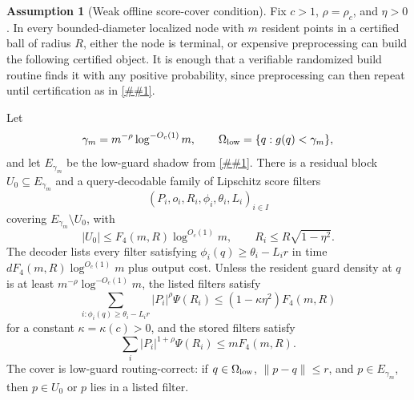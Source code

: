 \documentclass[10pt]{article}
\newcommand{\cref}[1]{\ref{##1}}
\theoremstyle{definition}
\newtheorem{assumption}[theorem]{Assumption}
\begin{document}
\begin{assumption}[Weak offline score-cover condition]\label{asm:weak-offline-score-cover}
   Fix $c>1$, $\rho=\rho_c$, and $\eta>0$.  In every bounded-diameter localized
   node with $m$ resident points in a certified ball of radius $R$, either the
   node is terminal, or expensive preprocessing can build the following
   certified object.  It is enough that a verifiable randomized build routine
   finds it with any positive probability, since preprocessing can then repeat
   until certification as in \cref{lem:las-vegas-offline}.

   Let
   \[
      \gamma_m=m^{-\rho}\log^{-O_c(1)}m,
      \qquad
      \Omega_{\rm low}=\{q:g(q)<\gamma_m\},
   \]
   and let $E_{\gamma_m}$ be the low-guard shadow from
   \cref{lem:low-guard-shadow}.  There is a residual block
   $U_0\subseteq E_{\gamma_m}$ and a query-decodable family of Lipschitz score
   filters
   \[
      (P_i,o_i,R_i,\phi_i,\theta_i,L_i)_{i\in I}
   \]
   covering $E_{\gamma_m}\setminus U_0$, with
   \[
      |U_0|\le F_4(m,R)\log^{O_c(1)}m,
      \qquad
      R_i\le R\sqrt{1-\eta^2}.
   \]
   The decoder lists every filter satisfying
   $\phi_i(q)\ge\theta_i-L_i r$ in time
   $dF_4(m,R)\log^{O_c(1)}m$ plus output cost.  Unless the resident guard
   density at $q$ is at least $m^{-\rho}\log^{-O_c(1)}m$, the listed filters
   satisfy
   \[
      \sum_{i:\phi_i(q)\ge\theta_i-L_i r}
      |P_i|^\rho\Psi(R_i)
      \le
      (1-\kappa\eta^2)F_4(m,R)
   \]
   for a constant $\kappa=\kappa(c)>0$, and the stored filters satisfy
   \[
      \sum_i |P_i|^{1+\rho}\Psi(R_i)
      \le
      mF_4(m,R).
   \]
   The cover is low-guard routing-correct: if $q\in\Omega_{\rm low}$,
   $\|p-q\|\le r$, and $p\in E_{\gamma_m}$, then $p\in U_0$ or $p$ lies in a
   listed filter.


\end{assumption}
\end{document}
